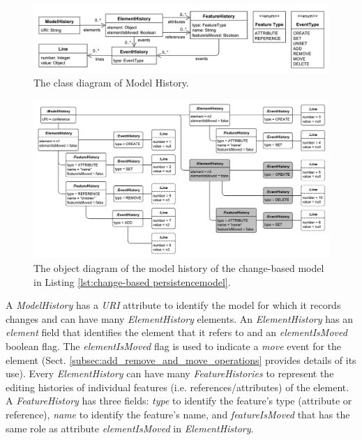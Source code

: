 \documentclass[12pt, a4paper]{report} \usepackage[titletoc]{appendix}
\begin{document}
\begin{figure}[ht]
	\centering
	\includegraphics[width=\linewidth]{object_history}
	\caption{The class diagram of Model History.}
	\label{fig:object_history}
\end{figure}

\begin{figure}[ht]
	\centering
	\includegraphics[width=\linewidth]{history_structure}
	\caption{The object diagram of the model history of the change-based model in Listing \ref{lst:change-based persistencemodel}.}
	\label{fig:history_structure}
\end{figure}

A \emph{ModelHistory} has a \emph{URI} attribute to identify the model for which it records changes and can have many \emph{ElementHistory} elements. An \emph{ElementHistory} has an \emph{element} field that identifies the element that it refers to and an \emph{elementIsMoved} boolean flag. The  \emph{elementIsMoved} flag is used to indicate a \emph{move} event for the element (Sect. \ref{subsec:add_remove_and_move_operations} provides details of its use). Every \emph{ElementHistory} can have many \emph{FeatureHistories} to represent the editing histories of individual features (i.e. references/attributes) of the element.  A \emph{FeatureHistory} has three fields: \emph{type} to identify the feature's type (attribute or reference), \emph{name} to identify the feature's name, and \emph{featureIsMoved} that has the same role as attribute \emph{elementIsMoved} in \emph{ElementHistory}.
\end{document}
